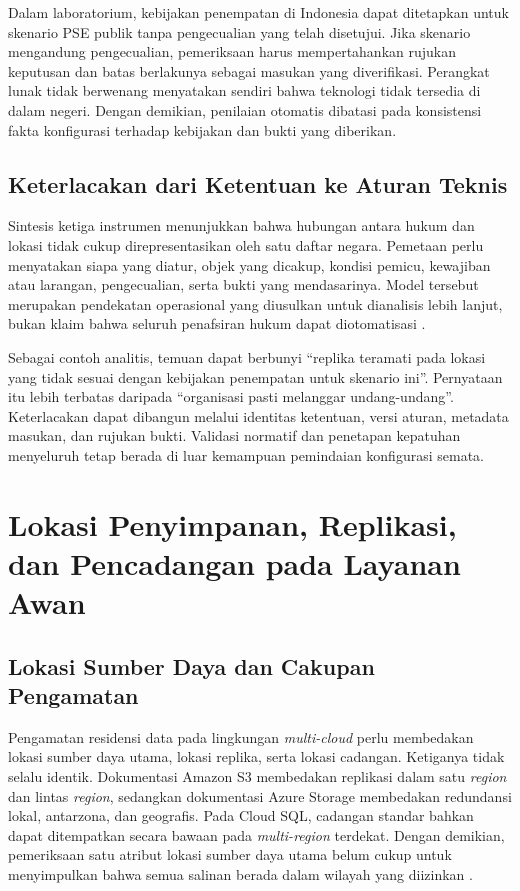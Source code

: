Dalam laboratorium, kebijakan penempatan di Indonesia dapat ditetapkan untuk skenario PSE publik tanpa pengecualian yang telah disetujui. Jika skenario mengandung pengecualian, pemeriksaan harus mempertahankan rujukan keputusan dan batas berlakunya sebagai masukan yang diverifikasi. Perangkat lunak tidak berwenang menyatakan sendiri bahwa teknologi tidak tersedia di dalam negeri. Dengan demikian, penilaian otomatis dibatasi pada konsistensi fakta konfigurasi terhadap kebijakan dan bukti yang diberikan.

\subsection{Keterlacakan dari Ketentuan ke Aturan Teknis}
Sintesis ketiga instrumen menunjukkan bahwa hubungan antara hukum dan lokasi tidak cukup direpresentasikan oleh satu daftar negara. Pemetaan perlu menyatakan siapa yang diatur, objek yang dicakup, kondisi pemicu, kewajiban atau larangan, pengecualian, serta bukti yang mendasarinya. Model tersebut merupakan pendekatan operasional yang diusulkan untuk dianalisis lebih lanjut, bukan klaim bahwa seluruh penafsiran hukum dapat diotomatisasi \autocite{edpb2023,uupdp2022,pp712019}.

Sebagai contoh analitis, temuan dapat berbunyi ``replika teramati pada lokasi yang tidak sesuai dengan kebijakan penempatan untuk skenario ini''. Pernyataan itu lebih terbatas daripada ``organisasi pasti melanggar undang-undang''. Keterlacakan dapat dibangun melalui identitas ketentuan, versi aturan, metadata masukan, dan rujukan bukti. Validasi normatif dan penetapan kepatuhan menyeluruh tetap berada di luar kemampuan pemindaian konfigurasi semata.

\section{Lokasi Penyimpanan, Replikasi, dan Pencadangan pada Layanan Awan}
\label{sec:layanan-cloud}
\label{sec:b2c-lokasi-cloud}

\subsection{Lokasi Sumber Daya dan Cakupan Pengamatan}

Pengamatan residensi data pada lingkungan \textit{multi-cloud} perlu membedakan lokasi sumber daya utama, lokasi replika, serta lokasi cadangan. Ketiganya tidak selalu identik. Dokumentasi Amazon S3 membedakan replikasi dalam satu \textit{region} dan lintas \textit{region}, sedangkan dokumentasi Azure Storage membedakan redundansi lokal, antarzona, dan geografis. Pada Cloud SQL, cadangan standar bahkan dapat ditempatkan secara bawaan pada \textit{multi-region} terdekat. Dengan demikian, pemeriksaan satu atribut lokasi sumber daya utama belum cukup untuk menyimpulkan bahwa semua salinan berada dalam wilayah yang diizinkan \autocite{b2c_awsS3Replication,b2c_azureStorageRedundancy,b2c_gcpSqlBackups}.

